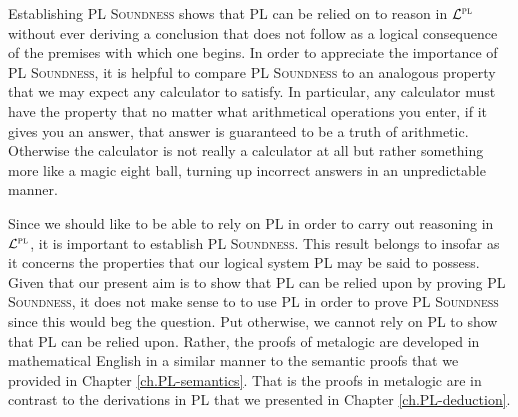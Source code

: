 Establishing \textsc{PL Soundness} shows that PL can be relied on to reason in $\mathcal{L}^{\textsc{pl}}$ without ever deriving a conclusion that does not follow as a logical consequence of the premises with which one begins. 
In order to appreciate the importance of \textsc{PL Soundness}, it is helpful to compare \textsc{PL Soundness} to an analogous property that we may expect any calculator to satisfy.
In particular, any calculator must have the property that no matter what arithmetical operations you enter, if it gives you an answer, that answer is guaranteed to be a truth of arithmetic.
Otherwise the calculator is not really a calculator at all but rather something more like a magic eight ball, turning up incorrect answers in an unpredictable manner.

%

Since we should like to be able to rely on PL in order to carry out reasoning in $\mathcal{L}^{\textsc{pl}}$, it is important to establish \textsc{PL Soundness}.
This result belongs to  insofar as it concerns the properties that our logical system PL may be said to possess.
Given that our present aim is to show that PL can be relied upon by proving \textsc{PL Soundness}, it does not make sense to to use PL in order to prove \textsc{PL Soundness} since this would beg the question.
Put otherwise, we cannot rely on PL to show that PL can be relied upon.
Rather, the proofs of metalogic are developed in mathematical English in a similar manner to the semantic proofs that we provided in Chapter \ref{ch.PL-semantics}.
That is the proofs in metalogic are  in contrast to the  derivations in PL that we presented in Chapter \ref{ch.PL-deduction}.

